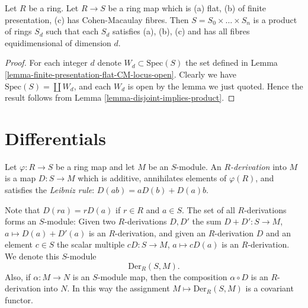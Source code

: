 \begin{lemma}
\label{lemma-relative-dimension-CM}
Let $R$ be a ring. Let $R \to S$ be a ring map
which is (a) flat, (b) of finite presentation, (c) has
Cohen-Macaulay fibres. Then $S = S_0 \times \ldots \times S_n$
is a product of rings $S_d$ such that each $S_d$ satisfies
(a), (b), (c) and has all fibres equidimensional of dimension $d$.
\end{lemma}

\begin{proof}
For each integer $d$ denote $W_d \subset \text{Spec}(S)$ the set
defined in Lemma \ref{lemma-finite-presentation-flat-CM-locus-open}.
Clearly we have $\text{Spec}(S) = \coprod W_d$, and each $W_d$
is open by the lemma we just quoted. Hence the result follows
from Lemma \ref{lemma-disjoint-implies-product}.
\end{proof}
















\section{Differentials}
\label{section-differentials}

\begin{definition}
\label{definition-derivation}
Let $\varphi : R \to S$ be a ring map and let $M$ be an $S$-module.
An {\it $R$-derivation} into $M$ is a map $D : S \to M$
which is additive, annihilates elements of $\varphi(R)$,
and satisfies the {\it Leibniz rule}:
$D(ab) = aD(b) + D(a)b$.
\end{definition}

\noindent
Note that $D(ra) = rD(a)$ if $r\in R$ and $a\in S$.
The set of all $R$-derivations forms an
$S$-module: Given two $R$-derivations $D, D'$
the sum $D + D' : S \to M$, $a \mapsto D(a)+D'(a)$
is an $R$-derivation, and given an $R$-derivation $D$
and an element $c\in S$ the scalar multiple $cD : S \to M$,
$a \mapsto cD(a)$ is an $R$-derivation. We denote this
$S$-module
$$
\text{Der}_R(S, M).
$$
Also, if $\alpha : M \to N$ is an $S$-module map, then the
composition $\alpha \circ D$ is an $R$-derivation into
$N$. In this way the assignment $M \mapsto \text{Der}_R(S, M)$
is a covariant functor.

